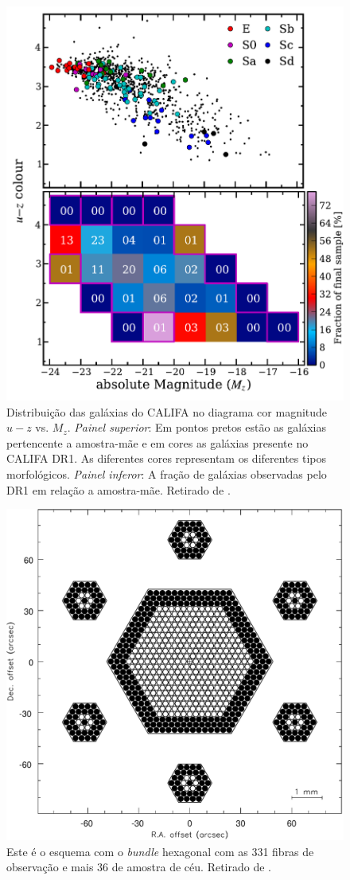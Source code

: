 \begin{figure}
    \includegraphics[height=0.5\textwidth]{figuras/figHusemann2013Fig2.pdf}
    \caption[Diagrama cor-magnitude para as galáxias do CALIFA.]
    {Distribui\c{c}\~ao das galáxias do CALIFA no diagrama cor magnitude $u-z$ vs. $M_z$. {\em Painel superior}: Em
    pontos pretos est\~ao as galáxias pertencente a amostra-m\~ae e em cores as galáxias presente no CALIFA DR1. As
    diferentes cores representam os diferentes tipos morfológicos. {\em Painel inferor}: A fra\c{c}\~ao de galáxias
    observadas pelo DR1 em rela\c{c}\~ao a amostra-m\~ae. Retirado de \citet{Husemann2013}.}
    \label{fig:cm-uzMz}
\end{figure}

\begin{figure}
    \includegraphics[height=0.5\textwidth]{figuras/figVerheijen2004Fig5.pdf}
    \caption[Configura\c{c}\~ao do {\em bundle} de fibras do PPMAS/PPAK.]
    {Este é o esquema com o {\em bundle} hexagonal com as 331 fibras de observação e mais 36 de amostra de céu. Retirado
    de \citet{Verheijen2004}.}
    \label{fig:BundlePPAK}
\end{figure}

